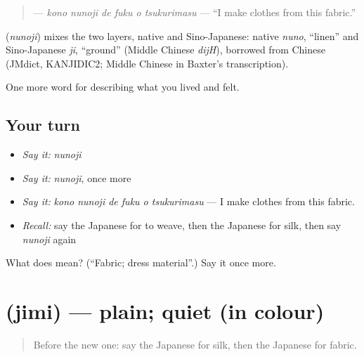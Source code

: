 \begin{quote}
\textbf{   } — \emph{kono nunoji de fuku o tsukurimasu} — \textquotedblleft{}I make clothes from this fabric.\textquotedblright{}
\end{quote}

\begin{cousinweb}
\textbf{} (\emph{nunoji}) mixes the two layers, native and Sino-Japanese: native \emph{nuno}, \textquotedblleft{}linen\textquotedblright{} and Sino-Japanese \emph{ji}, \textquotedblleft{}ground\textquotedblright{} (Middle Chinese \emph{dijH}), borrowed from Chinese (JMdict, KANJIDIC2; Middle Chinese in Baxter's transcription).
\end{cousinweb}

\begin{grammarlens}[title={What you've built}]
One more word for describing what you lived and felt.
\end{grammarlens}

\subsection*{Your turn}
\begin{itemize}
\raggedright
  \item \emph{Say it:} \emph{nunoji}
  \item \emph{Say it:} \emph{nunoji}, once more
  \item \emph{Say it:} \emph{kono nunoji de fuku o tsukurimasu} — I make clothes from this fabric.
  \item \emph{Recall:} say the Japanese for to weave, then the Japanese for silk, then say \emph{nunoji} again
\end{itemize}

\begin{tcolorbox}[breakable,colback=teal!4,colframe=teal!35!black,title={Before you move on}]
What does  mean? (\textquotedblleft{}Fabric; dress material\textquotedblright{}.) Say it once more.
\end{tcolorbox}
\section[\texorpdfstring{\ja{じみ} (jimi)}{じみ (jimi)}]{ (jimi) — plain; quiet (in colour)}

\label{lesson:JA-C485-jimi}



\begin{quote}
Before the new one: say the Japanese for silk, then the Japanese for fabric.
\end{quote}

